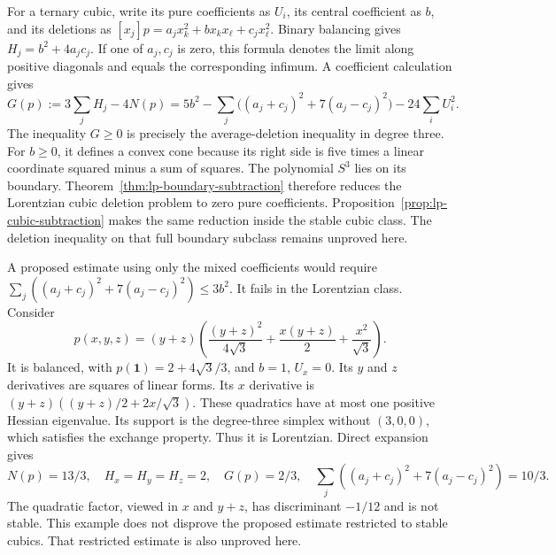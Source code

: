 \documentclass[11pt,a4paper]{article}
\theoremstyle{definition}
\theoremstyle{remark}
\begin{document}
For a ternary cubic, write its pure coefficients as $U_i$, its central coefficient as $b$, and its deletions as
$[x_j]p=a_jx_k^2+b x_kx_\ell+c_jx_\ell^2$.
Binary balancing gives $H_j=b^2+4a_jc_j$.
If one of $a_j,c_j$ is zero, this formula denotes the limit along positive diagonals and equals the corresponding infimum.
A coefficient calculation gives
\begin{equation}\label{eq:lp-cubic-cone}
 G(p):=3\sum_jH_j-4N(p)
 =5b^2-\sum_j\bigl((a_j+c_j)^2+7(a_j-c_j)^2\bigr)-24\sum_iU_i^2.
\end{equation}
The inequality $G\ge0$ is precisely the average-deletion inequality in degree three.
For $b\ge0$, it defines a convex cone because its right side is five times a linear coordinate squared minus a sum of squares.
The polynomial $S^3$ lies on its boundary.
Theorem~\ref{thm:lp-boundary-subtraction} therefore reduces the Lorentzian cubic deletion problem to zero pure coefficients.
Proposition~\ref{prop:lp-cubic-subtraction} makes the same reduction inside the stable cubic class.
The deletion inequality on that full boundary subclass remains unproved here.

A proposed estimate using only the mixed coefficients would require
$\sum_j((a_j+c_j)^2+7(a_j-c_j)^2)\le3b^2$.
It fails in the Lorentzian class.
Consider
\[
 p(x,y,z)=(y+z)\left(\frac{(y+z)^2}{4\sqrt3}
 +\frac{x(y+z)}2+\frac{x^2}{\sqrt3}\right).
\]
It is balanced, with $p(\mathbf1)=2+4\sqrt3/3$, and $b=1$, $U_x=0$.
Its $y$ and $z$ derivatives are squares of linear forms.
Its $x$ derivative is $(y+z)((y+z)/2+2x/\sqrt3)$.
These quadratics have at most one positive Hessian eigenvalue.
Its support is the degree-three simplex without $(3,0,0)$, which satisfies the exchange property.
Thus it is Lorentzian.
Direct expansion gives
\[
 N(p)=13/3,\quad H_x=H_y=H_z=2,\quad G(p)=2/3,
 \quad \sum_j((a_j+c_j)^2+7(a_j-c_j)^2)=10/3.
\]
The quadratic factor, viewed in $x$ and $y+z$, has discriminant $-1/12$ and is not stable.
This example does not disprove the proposed estimate restricted to stable cubics.
That restricted estimate is also unproved here.
\end{document}
